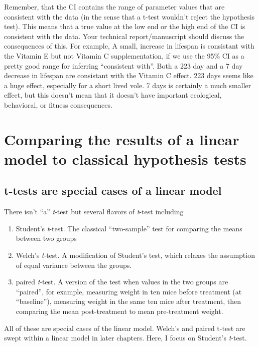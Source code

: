 \documentclass[]{book}
\providecommand{\tightlist}{%
  \setlength{\itemsep}{0pt}\setlength{\parskip}{0pt}}
\begin{document}
Remember, that the CI contains the range of parameter values that are
consistent with the data (in the sense that a t-test wouldn't reject the
hypothesis test). This means that a true value at the low end or the
high end of the CI is consistent with the data. Your technical
report/manuscript should discuss the consequences of this. For example,
A small, increase in lifespan is consistant with the Vitamin E but not
Vitamin C supplementation, if we use the 95\% CI as a pretty good range
for inferring ``consistent with''. Both a 223 day and a 7 day decrease
in lifespan are consistant with the Vitamin C effect. 223 days seems
like a huge effect, especially for a short lived vole. 7 days is
certainly a much smaller effect, but this doesn't mean that it doesn't
have important ecological, behavioral, or fitness consequences.

\section{Comparing the results of a linear model to classical hypothesis
tests}\label{comparing-the-results-of-a-linear-model-to-classical-hypothesis-tests}

\subsection{t-tests are special cases of a linear
model}\label{t-tests-are-special-cases-of-a-linear-model}

There isn't ``a'' \emph{t}-test but several flavors of \emph{t}-test
including

\begin{enumerate}
\def\labelenumi{\arabic{enumi}.}
\tightlist
\item
  Student's \emph{t}-test. The classical ``two-sample'' test for
  comparing the means between two groups
\item
  Welch's \emph{t}-test. A modification of Student's test, which relaxes
  the assumption of equal variance between the groups.
\item
  paired \emph{t}-test. A version of the test when values in the two
  groups are ``paired'', for example, measuring weight in ten mice
  before treatment (at ``baseline''), measuring weight in the same ten
  mice after treatment, then comparing the mean post-treatment to mean
  pre-treatment weight.
\end{enumerate}

All of these are special cases of the linear model. Welch's and paired
t-test are swept within a linear model in later chapters. Here, I focus
on Student's \emph{t}-test.
\end{document}
